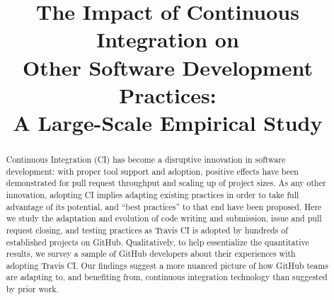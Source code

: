 \documentclass[10pt,conference]{IEEEtran}
\newcommand{\GH}{{\sc GitHub}\xspace}
\newcommand{\Tvis}{{\sc Travis CI}\xspace}
\newcommand\blfootnote[1]{%
  \begingroup
  \renewcommand\thefootnote{}\footnote{#1}%
  \addtocounter{footnote}{-1}%
  \endgroup
}
\begin{document}
\title{The Impact of Continuous Integration on \\Other Software 
Development Practices: \\A Large-Scale Empirical Study}


\author
{
\and
{}
\and
{}
\and
{}
\and
{}
}
\maketitle
\begin{abstract}
Continuous Integration (CI)
has become a disruptive innovation in software development: with proper 
tool support and adoption, positive effects have been demonstrated for pull 
request throughput and scaling up of project sizes. 
As any other innovation, adopting CI implies adapting existing practices in 
order to take full advantage of its potential, and ``best practices'' to that end 
have been proposed. 
Here we study the adaptation and evolution of code writing and submission,
issue and pull request closing, and testing practices as \Tvis is adopted by 
hundreds of established projects on \GH. 
Qualitatively, to help essentialize the quantitative results, we survey a 
sample of \GH developers about their experiences with adopting \Tvis. 
Our findings suggest a more nuanced picture of how \GH teams are adapting to, and
benefiting from, continuous integration technology than suggested by prior
work.
\end{abstract}







%





\balance

\newpage


\end{document}
